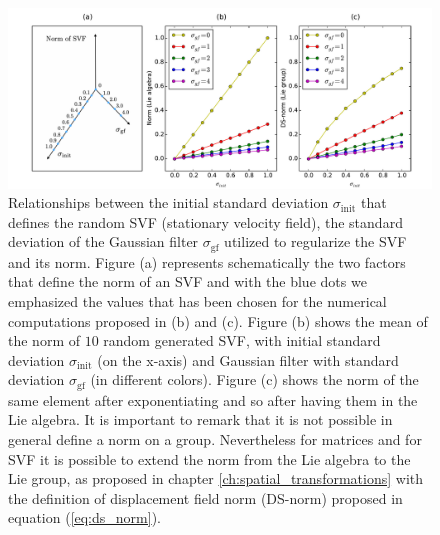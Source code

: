 \begin{figure}[!ht]
	\hspace{-1cm}
	\includegraphics[scale=0.51]{figures/SVF_sigma_means_comparisons.pdf}
	\caption{Relationships between the initial standard deviation $\sigma_{\text{init}}$ that defines the random SVF (stationary velocity field), the standard deviation of the Gaussian filter $\sigma_{\text{gf}}$ utilized to regularize the SVF and its norm. Figure (a) represents schematically the two factors that define the norm of an SVF and with the blue dots we emphasized the values that has been chosen for the numerical computations proposed in (b) and (c). Figure (b) shows the mean of the norm of $10$ random generated SVF, with initial standard deviation $\sigma_{\text{init}}$ (on the x-axis) and Gaussian filter with standard deviation $\sigma_{\text{gf}}$ (in different colors).
		Figure (c) shows the norm of the same element after exponentiating and so after having them in the Lie algebra.
		It is important to remark that it is not possible in general define a norm on a group. Nevertheless for matrices and for SVF it is possible to extend the norm from the Lie algebra to the Lie group, as proposed in chapter \ref{ch:spatial_transformations} with the definition of displacement field norm (DS-norm) proposed in equation (\ref{eq:ds_norm}). }
	\label{fig:SVF_sigma_means_comparisons}
\end{figure}

